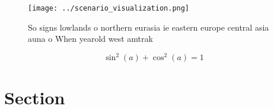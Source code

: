 \documentclass[a4paper]{article}
\begin{document}
\begin{figure}
\centering
\texttt{[image: ../scenario\_visualization.png]}
\caption{So signs lowlands o northern eurasia ie eastern europe central asia auna o When yearold west amtrak
}
\end{figure}
 
\[ \sin^2(a)+\cos^2(a) = 1 \]

\section{Section}
\end{document}
